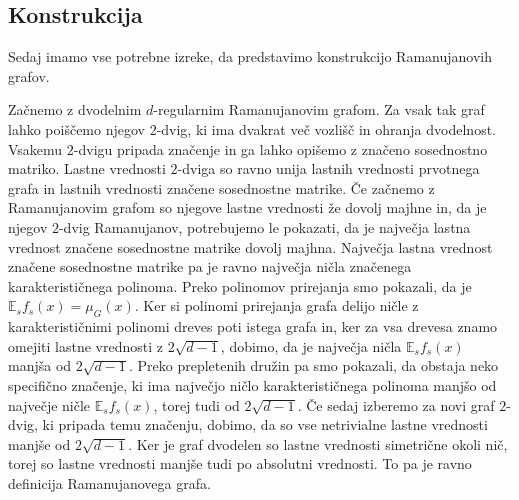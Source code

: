 \subsection{Konstrukcija}
Sedaj imamo vse potrebne izreke, da predstavimo konstrukcijo Ramanujanovih grafov.

Začnemo z dvodelnim \(d\)-regularnim Ramanujanovim grafom. Za vsak tak graf lahko poiščemo njegov \(2\)-dvig, ki ima dvakrat več vozlišč in ohranja dvodelnost. Vsakemu \(2\)-dvigu pripada značenje in ga lahko opišemo z značeno sosednostno matriko. Lastne vrednosti \(2\)-dviga so ravno unija lastnih vrednosti prvotnega grafa in lastnih vrednosti značene sosednostne matrike. Če začnemo z Ramanujanovim grafom so njegove lastne vrednosti že dovolj majhne in, da je njegov \(2\)-dvig Ramanujanov, potrebujemo le pokazati, da je največja lastna vrednost značene sosednostne matrike dovolj majhna. Največja lastna vrednost značene sosednostne matrike pa je ravno največja ničla značenega karakterističnega polinoma. Preko polinomov prirejanja smo pokazali, da je \(\mathbb E_{s}f_s(x) = \mu_G(x)\). Ker si polinomi prirejanja grafa delijo ničle z karakterističnimi polinomi dreves poti istega grafa in, ker za vsa drevesa znamo omejiti lastne vrednosti z \(2\sqrt{d-1}\), dobimo, da je največja ničla \(\mathbb E_{s}f_s(x)\) manjša od \(2\sqrt{d-1}\). Preko prepletenih družin pa smo pokazali, da obstaja neko specifično značenje, ki ima največjo ničlo karakterističnega polinoma manjšo od največje ničle \(\mathbb E_{s}f_s(x)\), torej tudi od \(2\sqrt{d-1}\). Če sedaj izberemo za novi graf \(2\)-dvig, ki pripada temu značenju, dobimo, da so vse netrivialne lastne vrednosti manjše od \(2\sqrt{d-1}\). Ker je graf dvodelen so lastne vrednosti simetrične okoli nič, torej so lastne vrednosti manjše tudi po absolutni vrednosti. To pa je ravno definicija Ramanujanovega grafa.

